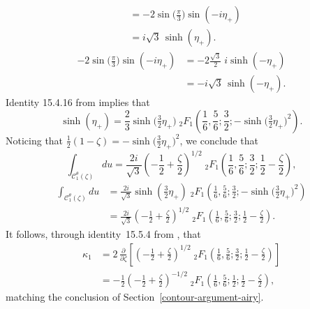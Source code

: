 \documentclass{article}
\theoremstyle{definition}
\theoremstyle{plain}
\newenvironment{verify}{\color{ForestGreen}}{\color{black}}
\newenvironment{revised}{\color{DarkBlue}}{\color{black}}
\begin{document}
\begin{revised}
\begin{align*}
& = -2 \sin\big(\tfrac{\pi}{3}\big) \sin(-i\eta_+) \\
& = i\sqrt{3}\,\sinh(\eta_+).
\end{align*}
\begin{verify}
\begin{align*}
-2 \sin\big(\tfrac{\pi}{3}\big) \sin(-i\eta_+) & = -2 \tfrac{\sqrt{3}}{2}\;i\sinh(-\eta_+) \\
& = -i\sqrt{3}\,\sinh(-\eta_+).
\end{align*}
\end{verify}
Identity 15.4.16 from \cite{dlmf} implies that
\[ \sinh(\eta_+) = \frac{2}{3} \sinh\big(\tfrac{3}{2}\eta_+\big)\;{}_2 F_1\left(\frac{1}{6}, \frac{5}{6}; \frac{3}{2}; -\sinh\big(\tfrac{3}{2}\eta_+\big)^2\right). \]
Noticing that $\tfrac{1}{2}(1 - \zeta) = -\sinh\big(\tfrac{3}{2}\eta_+\big)^2$, we conclude that
\[ \int_{\mathcal{C}_1^\theta(\zeta)} du = \frac{2i}{\sqrt{3}} \left(-\frac{1}{2} + \frac{\zeta}{2}\right)^{1/2}\;{}_2 F_1\left(\frac{1}{6}, \frac{5}{6}; \frac{3}{2}; \frac{1}{2} - \frac{\zeta}{2}\right), \]
\begin{verify}
\begin{align*}
\int_{\mathcal{C}_1^\theta(\zeta)} du & = \frac{2i}{\sqrt{3}} \sinh\left(\frac{3}{2}\eta_+\right)\;{}_2 F_1\left(\frac{1}{6}, \frac{5}{6}; \frac{3}{2}; -\sinh\big(\tfrac{3}{2}\eta_+\big)^2\right) \\
& = \frac{2i}{\sqrt{3}} \left(-\frac{1}{2} + \frac{\zeta}{2}\right)^{1/2}\;{}_2 F_1\left(\frac{1}{6}, \frac{5}{6}; \frac{3}{2}; \frac{1}{2} - \frac{\zeta}{2}\right).
\end{align*}
\end{verify}
It follows, through identity~15.5.4 from \cite{dlmf}, that
\begin{align*}
\kappa_1 & = 2\,\frac{\partial}{\partial \zeta} \left[ \left(-\frac{1}{2} + \frac{\zeta}{2}\right)^{1/2}\;{}_2 F_1\left(\frac{1}{6}, \frac{5}{6}; \frac{3}{2}; \frac{1}{2} - \frac{\zeta}{2}\right) \right] \\
& = -\frac{1}{2} \left(-\frac{1}{2} + \frac{\zeta}{2}\right)^{-1/2}\;{}_2 F_1\left(\frac{1}{6}, \frac{5}{6}; \frac{1}{2}; \frac{1}{2} - \frac{\zeta}{2}\right),
\end{align*}
matching the conclusion of Section~\ref{contour-argument-airy}.
\end{revised}
\end{document}
